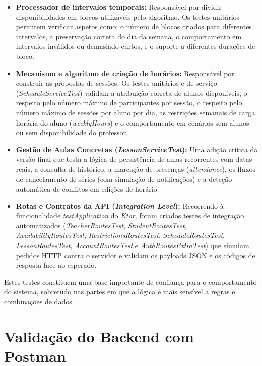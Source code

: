 \begin{itemize}
    \item \textbf{Processador de intervalos temporais:} Responsável por dividir disponibilidades em blocos utilizáveis pelo algoritmo. Os testes unitários permitem verificar aspetos como: o número de blocos criados para diferentes intervalos, a preservação correta do dia da semana, o comportamento em intervalos inválidos ou demasiado curtos, e o suporte a diferentes durações de bloco.

    \item \textbf{Mecanismo e algoritmo de criação de horários:} Responsável por construir as propostas de sessões. Os testes unitários e de serviço (\textit{ScheduleServiceTest}) validam a atribuição correta de alunos disponíveis, o respeito pelo número máximo de participantes por sessão, o respeito pelo número máximo de sessões por aluno por dia, as restrições semanais de carga horária do aluno (\textit{weeklyHours}) e o comportamento em cenários sem alunos ou sem disponibilidade do professor.

    \item \textbf{Gestão de Aulas Concretas (\textit{LessonServiceTest}):} Uma adição crítica da versão final que testa a lógica de persistência de aulas recorrentes com datas reais, a consulta de histórico, a marcação de presenças (\textit{attendance}), os fluxos de cancelamento de séries (com simulação de notificações) e a deteção automática de conflitos em edições de horário.

    \item \textbf{Rotas e Contratos da API (\textit{Integration Level}):} Recorrendo à funcionalidade \textit{testApplication} do \textit{Ktor}, foram criados testes de integração automatizados (\textit{TeacherRoutesTest}, \textit{StudentRoutesTest}, \textit{AvailabilityRoutesTest}, \textit{RestrictionsRoutesTest}, \textit{ScheduleRoutesTest}, \textit{LessonRoutesTest}, \textit{AccountRoutesTest} e \textit{AuthRoutesExtraTest}) que simulam pedidos HTTP contra o servidor e validam os payloads JSON e os códigos de resposta face ao esperado.
\end{itemize}

Estes testes constituem uma base importante de confiança para o comportamento do sistema, sobretudo nas partes em que a lógica é mais sensível a regras e combinações de dados.

\section{Validação do Backend com Postman}

